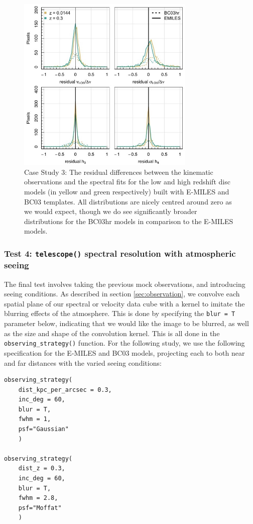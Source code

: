 \documentclass[
  journal=pasa,
  manuscript=research-paper, %
  year=2020,
  volume=37,
]{cup-journal}
\newcommand{\telescope}[1]{\texttt{telescope()}#1}
\newcommand{\observingstrategy}[1]{\texttt{observing\_strategy()}#1}
\begin{document}
\begin{figure}
    \centering
    \includegraphics[keepaspectratio, width=8.5cm]{cs3_histograms.jpeg}
    \caption{Case Study 3: The residual differences between the kinematic observations and the spectral fits for the low and high redshift disc models (in yellow and green respectively) built with E-MILES and BC03 templates. All distributions are nicely centred around zero as we would expect, though we do see significantly broader distributions for the BC03hr models in comparison to the E-MILES models.}
    \label{fig:cs3_hist}
\end{figure}

\subsubsection*{Test 4: \telescope{} spectral resolution with atmospheric seeing}

The final test involves taking the previous mock observations, and introducing seeing conditions. 
As described in section \ref{sec:observation}, we convolve each spatial plane of our spectral or velocity data cube with a kernel to imitate the blurring effects of the atmosphere. 
This is done by specifying the \texttt{blur = T} parameter below, indicating that we would like the image to be blurred, as well as the size and shape of the convolution kernel. 
This is all done in the \observingstrategy{} function. 
For the following study, we use the following specification for the E-MILES and \textsc{BC03} models, projecting each to both near and far distances with the varied seeing conditions:

\begin{lstlisting}[basicstyle=\fontsize{10}{8}\selectfont\ttfamily]
observing_strategy(
    dist_kpc_per_arcsec = 0.3, 
    inc_deg = 60, 
    blur = T,
    fwhm = 1, 
    psf="Gaussian"
    )

observing_strategy(
    dist_z = 0.3, 
    inc_deg = 60, 
    blur = T,
    fwhm = 2.8, 
    psf="Moffat"
    )
\end{lstlisting}
\end{document}
